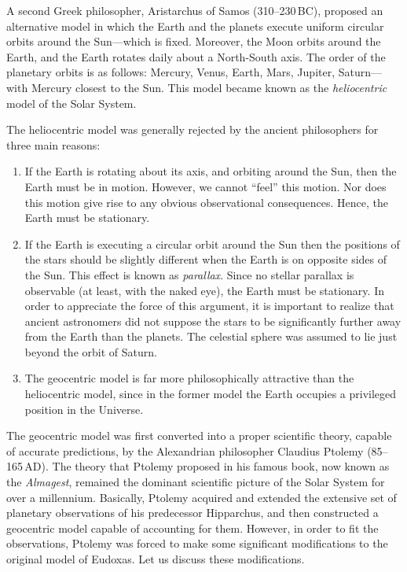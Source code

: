 A second Greek philosopher, Aristarchus of Samos (310--230\,BC), proposed an 
alternative model in which the Earth and the planets execute uniform
circular orbits around the Sun---which is fixed. Moreover, the Moon orbits around the Earth, and the Earth
rotates daily about a North-South axis. The
order of the planetary orbits is as follows: Mercury, Venus, Earth, Mars, Jupiter, Saturn---with Mercury
closest to the Sun. This model became known as the {\em heliocentric} model of the Solar System. 

The heliocentric model was generally rejected by the ancient philosophers for three main reasons:
\begin{enumerate}
\item If the Earth is rotating about its axis, and
orbiting around the Sun, then the Earth must be in motion. However, we cannot ``feel''
this motion. Nor does this motion give rise to any obvious observational consequences.
Hence, the Earth must be stationary.
\item If the Earth is executing a circular orbit around the Sun then the positions of the stars
should be slightly different when the Earth is on opposite sides of the Sun. This effect
is known as {\em parallax}. Since no stellar parallax is observable (at least, with the naked eye), the Earth
must be stationary. In order to appreciate the force of this argument, it is important to realize
that  ancient astronomers did not suppose the stars to be significantly further away from the Earth than
the planets. The celestial sphere was assumed to lie just beyond the orbit of Saturn.
\item The geocentric model is far more philosophically attractive than the heliocentric model, since in
the former model the Earth occupies a privileged position in the Universe.
\end{enumerate}

The geocentric model was first converted into a proper scientific theory, capable of accurate 
predictions, by the Alexandrian philosopher Claudius Ptolemy (85--165\,AD). The theory that Ptolemy proposed in his famous book, now known as the {\em Almagest}, remained the dominant scientific picture
of the Solar System  for over a millennium. Basically, Ptolemy acquired and extended the extensive 
set of planetary observations
of his predecessor Hipparchus, and then constructed a geocentric model capable of accounting
for them. However, in order to fit the observations, Ptolemy was forced to make
some significant modifications to the original model of Eudoxas. Let us
discuss these modifications.

